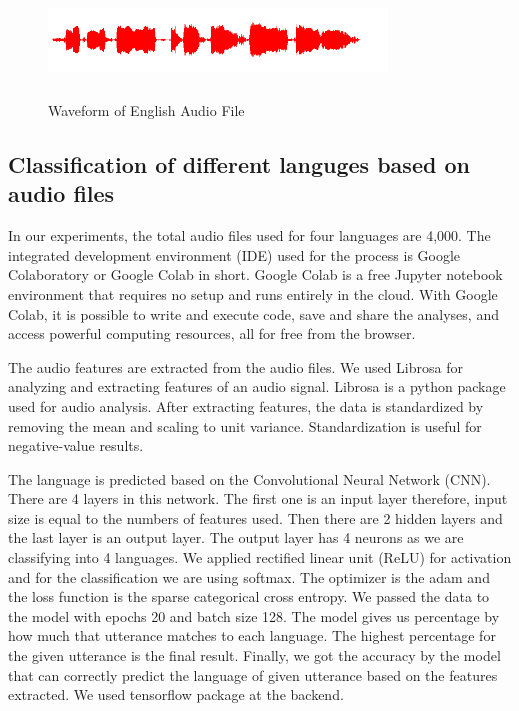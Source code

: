 \documentclass[conference]{IEEEtran}
\begin{document}
\begin{figure}[t]
\centerline{\includegraphics[width=90mm,height=3cm]{engwav.png}}
\caption{Waveform of English Audio File}
\label{fig:EngWav}
\end{figure}

\subsection{Classification of different languges based on audio files}\label{SubSec:AudioClassification}
In our experiments, the total audio files used for four languages are 4,000. The integrated development environment (IDE) used for the process is Google Colaboratory or Google Colab in short. Google Colab is a free Jupyter notebook environment that requires no setup and runs entirely in the cloud. With Google Colab, it is possible to write and execute code, save and share the analyses, and access powerful computing resources, all for free from the browser.

The audio features are extracted from the audio files. We used Librosa for analyzing and extracting features of an audio signal. Librosa is a python package used for audio analysis. After extracting features, the data is standardized by removing the mean and scaling to unit variance. Standardization is useful for negative-value results.

The language is predicted based on the Convolutional Neural Network (CNN). There are 4 layers in this network. The first one is an input layer therefore, input size is equal to the numbers of features used. Then there are 2 hidden layers and the last layer is an output layer. The output layer has 4 neurons as we are classifying into 4 languages. We applied rectified linear unit (ReLU) for activation and for the classification we are using softmax. The optimizer is the adam and the loss function is the sparse categorical cross entropy. We passed the data to the model with epochs 20 and batch size 128. The model gives us percentage by how much that  utterance matches to each language. The highest percentage for the given utterance is the final result. Finally, we got the accuracy by the model that can correctly predict the language of given utterance based on the features extracted. We used tensorflow package at the backend. 
\end{document}
